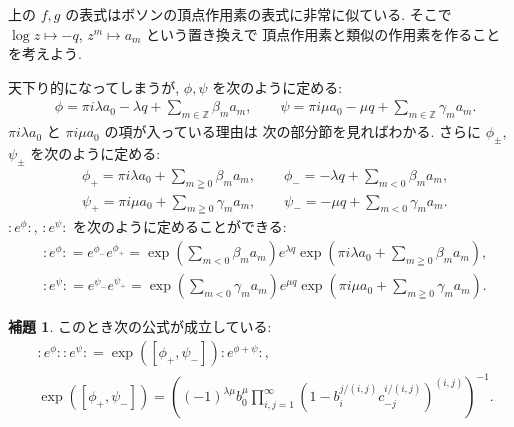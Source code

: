 \documentclass[12pt,twoside]{jarticle}
\newcommand\Z{{\mathbb Z}} %
\theoremstyle{definition} %
\newtheorem*{lemma*}{補題}
\theoremstyle{definition} %
\theoremstyle{definition} %
\numberwithin{theorem}{section}
\numberwithin{equation}{section}
\numberwithin{figure}{section}
\numberwithin{table}{section}
\newcommand\np[1]{{:}{#1}{:}}
\begin{document}
上の $f,g$ の表式はボソンの頂点作用素の表式に非常に似ている.
そこで $\log z\mapsto -q$, $z^m\mapsto a_m$ という置き換えで
頂点作用素と類似の作用素を作ることを考えよう.

天下り的になってしまうが, $\phi,\psi$ を次のように定める:
\begin{align*}
&
\phi = \pi i\lambda a_0 - \lambda q + \sum_{m\in\Z}\beta_m  a_m,
\qquad
\psi = \pi i\mu     a_0 - \mu     q + \sum_{m\in\Z}\gamma_m a_m.
\end{align*}
$\pi i\lambda a_0$ と $\pi i\mu a_0$ の項が入っている理由は
次の部分節を見ればわかる.
さらに $\phi_\pm$, $\psi_\pm$ を次のように定める:
\begin{align*}
&
\phi_+ = \pi i\lambda a_0 + \sum_{m\geqq0}\beta_m  a_m, \qquad
\phi_- = -\lambda q + \sum_{m<0}\beta_m a_m,
\\ &
\psi_+ = \pi i\mu     a_0 + \sum_{m\geqq0}\gamma_m a_m, \qquad
\psi_- = -\mu q     + \sum_{m<0}\gamma_m a_m.
\end{align*}
$\np{e^\phi}$, $\np{e^\psi}$ を次のように定めることができる:
\begin{align*}
&
\np{e^\phi}=e^{\phi_-}e^{\phi_+}=
\exp\left(\sum_{m<0} \beta_m a_m \right)
e^{\lambda q}
\exp\left(\pi i\lambda a_0+\sum_{m\geqq 0} \beta_m a_m \right),
\\ &
\np{e^\psi}=e^{\psi_-}e^{\psi_+}=
\exp\left(\sum_{m<0} \gamma_m a_m \right)
e^{\mu q}
\exp\left(\pi i \mu a_0 + \sum_{m\geqq 0} \gamma_m a_m \right).
\end{align*}

\begin{lemma*}
このとき次の公式が成立している:
\begin{align*}
&
\np{e^\phi}\np{e^\psi} = \exp([\phi_+,\psi_-])\np{e^{\phi+\psi}},
\\ &
\exp([\phi_+,\psi_-])=
\left(
(-1)^{\lambda\mu}b_0^\mu \prod_{i,j=1}^\infty\left(1-b_i^{j/(i,j)}c_{-j}^{i/(i,j)}\right)^{(i,j)}
\right)^{-1}.
\end{align*}
\end{lemma*}
\end{document}
